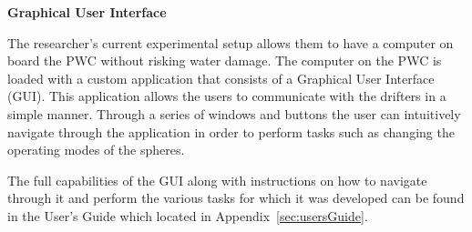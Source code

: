 \noindent\textbf{Graphical User Interface}

The researcher's current experimental setup allows them to have a computer on board the PWC without risking water damage.  The computer on the PWC is loaded with a custom application that consists of a Graphical User Interface (GUI).  This application allows the users to communicate with the drifters in a simple manner.   Through a series of windows and buttons the user can intuitively navigate through the application in order to perform tasks such as changing the operating modes of the spheres. 

The full capabilities of the GUI along with instructions on how to navigate through it and perform the various tasks for which it was developed can be found in the User's Guide which located in Appendix~\ref{sec:usersGuide}.  

